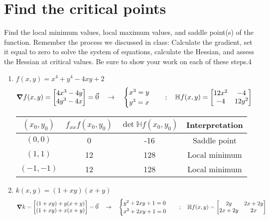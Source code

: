 \documentclass[12pt]{article}
\begin{document}
\section{Find the critical points }
Find the local minimum values, local maximum values, and saddle point(s) of the function. Remember the
process we discussed in class: Calculate the gradient, set it equal to zero to solve the system of equations,
calculate the Hessian, and assess the Hessian at critical values. Be sure to show your work on each of these
steps.4
\begin{enumerate}
    \item $f(x,y) = x^4 + y^4 -4xy +2$
    \begin{align*}
        \grad f(x,y) &= \begin{bmatrix}
            4x^3 -4y \\ 4y^3 -4x        \end{bmatrix} = \Vec{0} \quad \to \quad \begin{cases}
                x^3 =y
                \\ y^3 =x  
            \end{cases} \quad ; \quad \mathbb{H}f(x,y) = \begin{bmatrix}
                12x^2 & -4 \\ -4 & 12y^2
            \end{bmatrix}
    \end{align*}
\begin{center}
\begin{tabular}{ c |c |c |c }
 $(x_0,y_0)$ & $f_{xx} f(x_0,y_0)$ & $\det \mathbb{H}f(x_0,y_0)$ & Interpretation
 \\  \hline \hline
 $(0,0)$ &  0 & -16 & Saddle point\\  
 $(1,1) $& 12 & 128 & Local minimum \\  
 $(-1,-1)$&  12 & 128 & Local minimum 
 \end{tabular}
\end{center}

    \item $k(x,y)=(1+xy)(x+y)$
    \[ \grad k = \begin{bmatrix}
        (1+xy) + y(x+y) \\(1+xy) + x(x+y) 
    \end{bmatrix} = \Vec{0} \quad \to \quad \begin{cases}
        y^2 + 2xy +1=0
        \\ x^2 + 2xy +1=0
    \end{cases} \quad ; \quad \mathbb{H}f(x,y) = \begin{bmatrix}
                2y & 2x+2y \\ 2x+2y & 2x  \end{bmatrix}\]


\end{enumerate}
\end{document}
